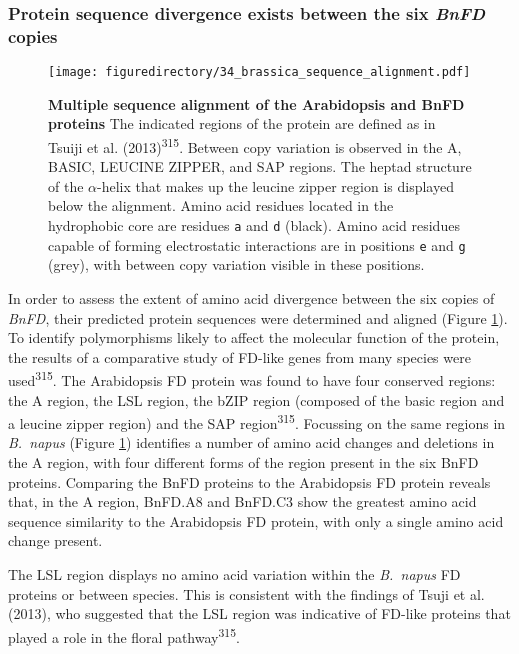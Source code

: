 \documentclass[12pt,]{book}
\begin{document}
\subsubsection{\texorpdfstring{Protein sequence divergence exists
between the six \emph{BnFD}
copies}{Protein sequence divergence exists between the six BnFD copies}}\label{section:spring:bnafddivergence}

\begin{figure}[htbp]
\centering
\texttt{[image: figuredirectory/34\_brassica\_sequence\_alignment.pdf]}
\caption{\textbf{Multiple sequence alignment of the Arabidopsis and BnFD
proteins} The indicated regions of the protein are defined as in Tsuiji
et al. (2013)\textsuperscript{315}. Between copy variation is observed
in the A, BASIC, LEUCINE ZIPPER, and SAP regions. The heptad structure
of the \(\alpha\)-helix that makes up the leucine zipper region is
displayed below the alignment. Amino acid residues located in the
hydrophobic core are residues \texttt{a} and \texttt{d} (black). Amino
acid residues capable of forming electrostatic interactions are in
positions \texttt{e} and \texttt{g} (grey), with between copy variation
visible in these positions.}\label{figure:234:brassicasequence}
\end{figure}

In order to assess the extent of amino acid divergence between the six
copies of \emph{BnFD}, their predicted protein sequences were determined
and aligned (Figure \ref{figure:234:brassicasequence}). To identify
polymorphisms likely to affect the molecular function of the protein,
the results of a comparative study of FD-like genes from many species
were used\textsuperscript{315}. The Arabidopsis FD protein was found to
have four conserved regions: the A region, the LSL region, the bZIP
region (composed of the basic region and a leucine zipper region) and
the SAP region\textsuperscript{315}. Focussing on the same regions in
\emph{B.~napus} (Figure \ref{figure:234:brassicasequence}) identifies a
number of amino acid changes and deletions in the A region, with four
different forms of the region present in the six BnFD proteins.
Comparing the BnFD proteins to the Arabidopsis FD protein reveals that,
in the A region, BnFD.A8 and BnFD.C3 show the greatest amino acid
sequence similarity to the Arabidopsis FD protein, with only a single
amino acid change present.

The LSL region displays no amino acid variation within the
\emph{B.~napus} FD proteins or between species. This is consistent with
the findings of Tsuji et al. (2013), who suggested that the LSL region
was indicative of FD-like proteins that played a role in the floral
pathway\textsuperscript{315}.
\end{document}
